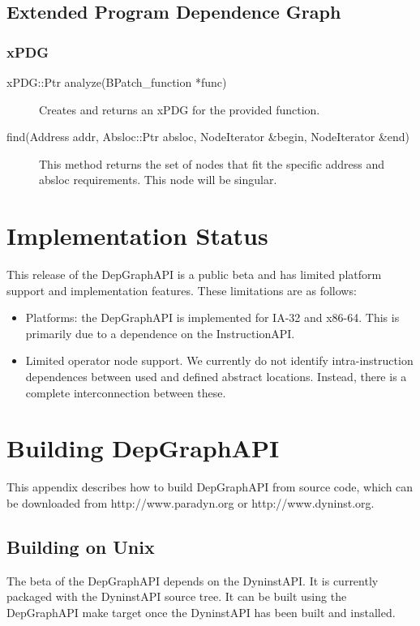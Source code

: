 \documentclass[12pt,titlepage]{article}
\begin{document}
\subsection{Extended Program Dependence Graph}
\subsubsection{xPDG}
\begin{description}
\item[xPDG::Ptr analyze(BPatch\_function *func)]
Creates and returns an xPDG for the provided function.
\item[find(Address addr, Absloc::Ptr absloc, NodeIterator \&begin, NodeIterator \&end) ]
This method returns the set of nodes that fit the specific address and absloc requirements. This node will be singular.
\end{description}

\section{Implementation Status}

This release of the DepGraphAPI is a public beta and has limited
platform support and implementation features. These limitations are as
follows:
\begin{itemize}
\item Platforms: the DepGraphAPI is implemented for IA-32 and
  x86-64. This is primarily due to a dependence on the InstructionAPI.
\item Limited operator node support. We currently do not identify
  intra-instruction dependences between used and defined abstract
  locations. Instead, there is a complete interconnection between
  these. 
\end{itemize}


\section{Building DepGraphAPI}
This appendix describes how to build DepGraphAPI from source code,
which can be downloaded from http://www.paradyn.org or
http://www.dyninst.org.

\subsection{Building on Unix}
The beta of the DepGraphAPI depends on the DyninstAPI. It is currently
packaged with the DyninstAPI source tree. It can be built using the
DepGraphAPI make target once the DyninstAPI has been built and
installed.
\end{document}
